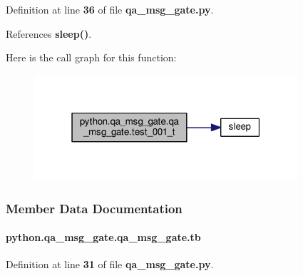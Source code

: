 Definition at line {\bf 36} of file {\bf qa\+\_\+msg\+\_\+gate.\+py}.



References {\bf sleep()}.



Here is the call graph for this function\+:
\nopagebreak
\begin{figure}[H]
\begin{center}
\leavevmode
\includegraphics[width=277pt]{d4/d35/classpython_1_1qa__msg__gate_1_1qa__msg__gate_a4f4619a0888d510388909d640961a4dd_cgraph}
\end{center}
\end{figure}




\subsubsection{Member Data Documentation}
\paragraph[{tb}]{\setlength{\rightskip}{0pt plus 5cm}python.\+qa\+\_\+msg\+\_\+gate.\+qa\+\_\+msg\+\_\+gate.\+tb}\label{classpython_1_1qa__msg__gate_1_1qa__msg__gate_aa1062e489885299e3107afa7dea99781}


Definition at line {\bf 31} of file {\bf qa\+\_\+msg\+\_\+gate.\+py}.



